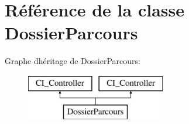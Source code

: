 \hypertarget{class_dossier_parcours}{}\section{Référence de la classe Dossier\+Parcours}
\label{class_dossier_parcours}
Graphe d\textquotesingle{}héritage de Dossier\+Parcours\+:\begin{figure}[H]
\begin{center}
\leavevmode
\includegraphics[height=2.000000cm]{class_dossier_parcours}
\end{center}
\end{figure}
